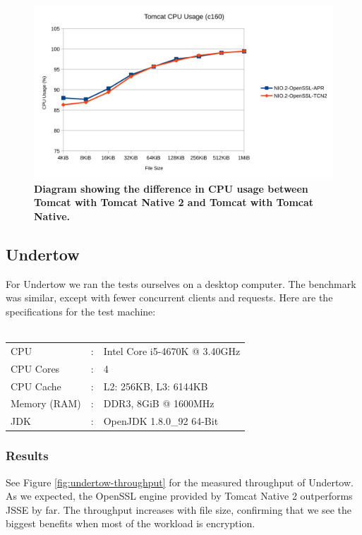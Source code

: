 \documentclass[11pt,a4paper,bibliography=totocnumbered]{scrartcl}
\def\mytitle{Tomcat Native 2}
\begin{document}
\begin{figure}[!h]
	\begin{center}
		\includegraphics[scale=0.22]{tomcat-cpu.pdf}
	\end{center}
	\caption{\textbf{Diagram showing the difference in CPU usage between Tomcat with \mytitle{} and Tomcat with Tomcat Native.}}
	\label{fig:tomcat-cpu}
\end{figure}

\subsection{Undertow}
For Undertow we ran the tests ourselves on a desktop computer. The benchmark was similar, except with fewer concurrent clients and requests.
Here are the specifications for the test machine:
\\
\\
\begin{tabular}{lrl}
	CPU&: & Intel Core i5-4670K @ 3.40GHz \\
	CPU Cores&: & 4 \\
	CPU Cache&: & L2: 256KB, L3: 6144KB \\
	Memory (RAM)&: & DDR3, 8GiB @ 1600MHz \\
	JDK&: & OpenJDK 1.8.0\_92 64-Bit
\end{tabular} 
\subsubsection{Results}
See Figure \ref{fig:undertow-throughput} for the measured throughput of Undertow.
As we expected, the OpenSSL engine provided by \mytitle{} outperforms JSSE by far. The throughput increases with file size, confirming that we see the biggest benefits when most of the workload is encryption.
\end{document}
